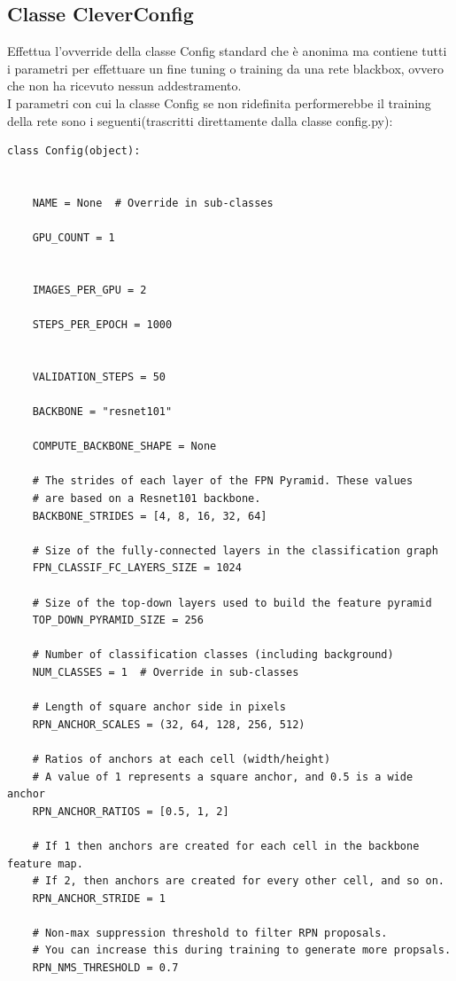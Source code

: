 \subsection*{Classe CleverConfig}
Effettua l'ovverride della classe Config standard che è anonima ma contiene tutti i parametri per effettuare un fine tuning o training da una rete blackbox, ovvero che non ha ricevuto nessun addestramento.\\
I parametri con cui la classe Config se non ridefinita performerebbe il training della rete sono i seguenti(trascritti direttamente dalla classe config.py):\\

\begin{lstlisting}
class Config(object):

 
    NAME = None  # Override in sub-classes

    GPU_COUNT = 1

  
    IMAGES_PER_GPU = 2

    STEPS_PER_EPOCH = 1000

  
    VALIDATION_STEPS = 50

    BACKBONE = "resnet101"

    COMPUTE_BACKBONE_SHAPE = None

    # The strides of each layer of the FPN Pyramid. These values
    # are based on a Resnet101 backbone.
    BACKBONE_STRIDES = [4, 8, 16, 32, 64]

    # Size of the fully-connected layers in the classification graph
    FPN_CLASSIF_FC_LAYERS_SIZE = 1024

    # Size of the top-down layers used to build the feature pyramid
    TOP_DOWN_PYRAMID_SIZE = 256

    # Number of classification classes (including background)
    NUM_CLASSES = 1  # Override in sub-classes

    # Length of square anchor side in pixels
    RPN_ANCHOR_SCALES = (32, 64, 128, 256, 512)

    # Ratios of anchors at each cell (width/height)
    # A value of 1 represents a square anchor, and 0.5 is a wide anchor
    RPN_ANCHOR_RATIOS = [0.5, 1, 2]

    # If 1 then anchors are created for each cell in the backbone feature map.
    # If 2, then anchors are created for every other cell, and so on.
    RPN_ANCHOR_STRIDE = 1

    # Non-max suppression threshold to filter RPN proposals.
    # You can increase this during training to generate more propsals.
    RPN_NMS_THRESHOLD = 0.7


\end{lstlisting}
